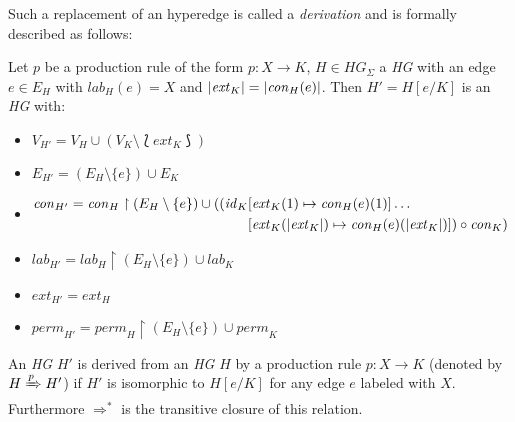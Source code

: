 	Such a replacement of an hyperedge is called a \emph{derivation} and is
	formally described as follows:
	\begin{definition}
		Let $p$ be a production rule of the form $p\colon X\rightarrow K$,
		$H\in\mathit{HG}_{\Sigma}$ a \emph{\ac{HG}} with an edge $e\in E_{H}$
		with $\mathit{lab}_{H}(e)=X$ and $|\mathit{ext}_K| = |\mathit{con}_{H}(e)|$. Then
		$H' = H[e/K]$ is an \emph{\ac{HG}} with:
		\begin{itemize}
			\item $V_{H'}=V_{H}\cup(V_{K}\setminus\Lbag \mathit{ext}_{K}\Rbag)$
			\item $E_{H'}=(E_{H}\setminus\{e\})\cup E_K$
			\item $\begin{aligned}
				\mathit{con}_{H'}=\mathit{con}_{H}\upharpoonright(E_{H} \setminus
				\{e\})\cup((\mathit{id}_{K}&[\mathit{ext}_{K}(1)\mapsto\mathit{con}_{H} (e)(1)]
				\dots\\
					&[\mathit{ext}_{K}(|\mathit{ext}_{K}|)\mapsto\mathit{con}_{H}(e)(|\mathit{ext}_{K}|)])\circ
				\mathit{con}_{K})
			\end{aligned}$
			\item $\mathit{lab}_{H'}=\mathit{lab}_{H}\upharpoonright(E_{H}
				\setminus\{e\})\cup\mathit{lab}_{K}$
			\item $\mathit{ext}_{H'}=\mathit{ext}_{H}$
			\item $\mathit{perm}_{H'}=\mathit{perm}_{H}\upharpoonright(E_{H}
				\setminus\{e\})\cup \mathit{perm}_{K}$
		\end{itemize}
	\end{definition}
	An \emph{\ac{HG}} $H'$ is derived from an \emph{\ac{HG}} $H$ by a production
	rule $p\colon X\rightarrow K$ (denoted by $H\xRightarrow{p}H'$) if $H'$ is
	isomorphic to $H[e/K]$ for any edge $e$ labeled with $X$. Furthermore
	$\Rightarrow^{\ast}$ is the transitive closure of this relation.
